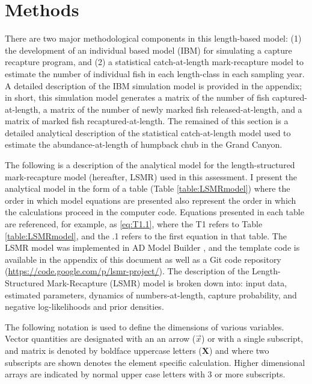 \section{Methods} %
\label{sec:methods}

There are two major methodological components in this length-based model: (1) the development of an individual based model (IBM) for simulating a capture recapture program, and (2) a statistical catch-at-length mark-recapture model to estimate the number of individual fish in each length-class in each sampling year.  A detailed description of the IBM simulation model is provided in the appendix; in short, this simulation model generates a matrix of the number of fish captured-at-length, a matrix of the number of newly marked fish released-at-length, and a matrix of marked fish recaptured-at-length.  The remained of this section is a detailed analytical description of the statistical catch-at-length model used to estimate the abundance-at-length of humpback chub in the Grand Canyon.

The following is a description of the analytical model for the length-structured mark-recapture model (hereafter, LSMR) used in this assessment.  I present the analytical model in the form of a table (Table \ref{table:LSMRmodel}) where the order in which model equations are presented also represent the order in which the calculations proceed in the computer code.  Equations presented in each table are referenced, for example, as \eqref{eq:T1.1}, where the T1 refers to Table \ref{table:LSMRmodel}, and the .1 refers to the first equation in that table. The LSMR model was implemented in AD Model Builder \citep{fournier2011ad}, and the template code is available in the appendix of this document as well as a Git code repository (\url{https://code.google.com/p/lsmr-project/}).  The description of the Length-Structured Mark-Recapture (LSMR) model is broken down into: input data, estimated parameters, dynamics of numbers-at-length, capture probability, and negative log-likelihoods and prior densities.

The following notation is used to define the dimensions of various variables. Vector quantities are designated with an an arrow ($\vec{x}$) or with a single subscript, and matrix is denoted by boldface uppercase letters ($\mathbf{X}$) and where two subscripts are shown denotes the element specific calculation.  Higher dimensional arrays are indicated by normal upper case letters with 3 or more subscripts.  

